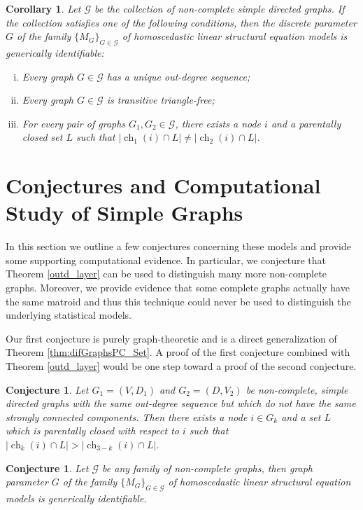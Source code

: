 \documentclass[12pt,reqno]{amsart}
\theoremstyle{plain}
\newtheorem{corollary}[theorem]{Corollary}
\newtheorem{conjecture}[theorem]{Conjecture}
\theoremstyle{definition}
\DeclareMathOperator{\ch}{ch}
\begin{document}
\begin{corollary}
 Let $\mathcal{G}$ be the collection of non-complete simple directed graphs. If the collection satisfies one of the following conditions, then the discrete parameter $G$ of the family $\{M_G\}_{G \in \mathcal{G}}$ of homoscedastic linear structural equation models is generically identifiable:
\begin{enumerate}[(i)]
    \item Every graph $G\in\mathcal{G}$ has a unique out-degree sequence;
    \item Every graph $G\in\mathcal{G}$ is transitive triangle-free;
    \item For every pair of graphs $G_1, G_2 \in\mathcal{G}$, there exists a node $i$ and a parentally closed set $L$ such that $|\ch_1(i) \cap L| \neq |\ch_2(i) \cap L|$. 
\end{enumerate}   
\end{corollary}




\section{Conjectures and Computational Study of Simple Graphs}
\label{sec:Conjectures}
In this section we outline a few conjectures concerning these models and provide some supporting computational evidence. In particular, we conjecture that Theorem \ref{outd_layer} can be used to distinguish many more non-complete graphs. Moreover, we provide evidence that some complete graphs actually have the same matroid and thus this technique could never be used to distinguish the underlying statistical models. 


Our first conjecture is purely graph-theoretic and is a direct generalization of Theorem \ref{thm:difGraphsPC_Set}. A proof of the first conjecture combined with Theorem \ref{outd_layer} would be one step toward a proof of the second conjecture.  

\begin{conjecture}
\label{conj:difGraphPCSets}
Let $G_1 = (V, D_1)$ and $G_2 = (D, V_2)$ be non-complete, simple directed graphs with the same out-degree sequence but which do not have the same strongly connected components. Then there exists a node $i \in G_k$ and a set $L$ which is parentally closed with respect to $i$ such that $|\ch_{k}(i)\cap L|>|\ch_{3-k}(i)\cap L|$. 
\end{conjecture}

\begin{conjecture}
Let $\mathcal{G}$ be any family of non-complete graphs, then graph parameter $G$ of the family $\{M_G\}_{G \in \mathcal{G}}$ of homoscedastic linear structural equation models is generically identifiable. 
\end{conjecture}
\end{document}
